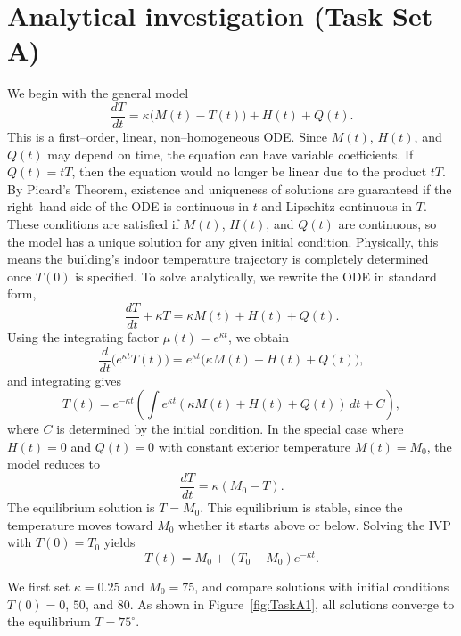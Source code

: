 \documentclass[12pt]{article}
\begin{document}
\section{Analytical investigation (Task Set A)}
We begin with the general model
\begin{equation}
\frac{dT}{dt} = \kappa \big(M(t) - T(t)\big) + H(t) + Q(t).
\label{eq:general}
\end{equation}
This is a first–order, linear, non–homogeneous ODE. Since $M(t)$, $H(t)$, and $Q(t)$ may depend on time, the equation can have variable coefficients. If $Q(t)=tT$, then the equation would no longer be linear due to the product $tT$. By Picard’s Theorem, existence and uniqueness of solutions are guaranteed if the right–hand side of the ODE is continuous in $t$ and Lipschitz continuous in $T$. These conditions are satisfied if $M(t)$, $H(t)$, and $Q(t)$ are continuous, so the model has a unique solution for any given initial condition. Physically, this means the building’s indoor temperature trajectory is completely determined once $T(0)$ is specified. To solve analytically, we rewrite the ODE in standard form,
\begin{equation}
\frac{dT}{dt} + \kappa T = \kappa M(t) + H(t) + Q(t).
\label{eq:standard}
\end{equation}
Using the integrating factor $\mu(t) = e^{\kappa t}$, we obtain
\begin{equation}
\frac{d}{dt}\big(e^{\kappa t}T(t)\big) = e^{\kappa t}\big(\kappa M(t) + H(t) + Q(t)\big),
\label{eq:IFderiv}
\end{equation}
and integrating gives
\begin{equation}
T(t) = e^{-\kappa t}\left(\int e^{\kappa t}(\kappa M(t) + H(t) + Q(t))\,dt + C\right),
\label{eq:integralsol}
\end{equation}
where $C$ is determined by the initial condition. In the special case where $H(t)=0$ and $Q(t)=0$ with constant exterior temperature $M(t)=M_0$, the model reduces to
\begin{equation}
\frac{dT}{dt} = \kappa(M_0 - T).
\label{eq:constantM}
\end{equation}
The equilibrium solution is $T=M_0$. This equilibrium is stable, since the temperature moves toward $M_0$ whether it starts above or below. Solving the IVP with $T(0)=T_0$ yields
\begin{equation}
T(t) = M_0 + (T_0 - M_0)e^{-\kappa t}.
\label{eq:closed}
\end{equation}

We first set $\kappa=0.25$ and $M_0=75$, and compare solutions with initial conditions $T(0)=0$, $50$, and $80$. As shown in Figure~\ref{fig:TaskA1}, all solutions converge to the equilibrium $T=75^\circ$. 
\end{document}
